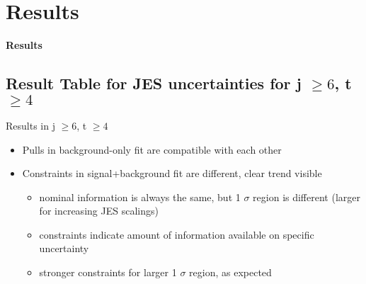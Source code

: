 \section{Results}

\begin{frame}
\begin{center}

\huge\textbf{Results}
\end{center}
\end{frame}

\subsection{Result Table for JES uncertainties for j $\geq 6$, t $\geq 4$}
\begin{frame}{Results in j $\geq 6$, t $\geq 4$}

\begin{itemize}
\item Pulls in background-only fit are compatible with each other
\item Constraints in signal+background fit are different, clear trend visible\\
\begin{itemize}
\item nominal information is always the same, but 1 $\sigma$ region is different (larger for increasing JES scalings)\\
\item constraints indicate amount of information available on specific uncertainty\\
\item stronger constraints for larger 1 $\sigma$ region, as expected
\end{itemize}
\end{itemize}
\end{frame}

